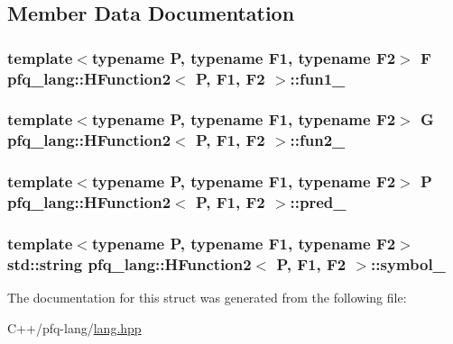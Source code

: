 \subsection{Member Data Documentation}
\hypertarget{structpfq__lang_1_1HFunction2_a1e7d18cef3f4fce903509c3562369418}{
\subsubsection[{fun1\+\_\+}]{\setlength{\rightskip}{0pt plus 5cm}template$<$typename P, typename F1, typename F2$>$ F {\bf pfq\+\_\+lang\+::\+H\+Function2}$<$ P, F1, F2 $>$\+::fun1\+\_\+}}\label{structpfq__lang_1_1HFunction2_a1e7d18cef3f4fce903509c3562369418}
\hypertarget{structpfq__lang_1_1HFunction2_a55766e7665c4a9f14f9fb5e35ca24405}{
\subsubsection[{fun2\+\_\+}]{\setlength{\rightskip}{0pt plus 5cm}template$<$typename P, typename F1, typename F2$>$ G {\bf pfq\+\_\+lang\+::\+H\+Function2}$<$ P, F1, F2 $>$\+::fun2\+\_\+}}\label{structpfq__lang_1_1HFunction2_a55766e7665c4a9f14f9fb5e35ca24405}
\hypertarget{structpfq__lang_1_1HFunction2_ab1f1307df8a4b1c23cd9e2905b308679}{
\subsubsection[{pred\+\_\+}]{\setlength{\rightskip}{0pt plus 5cm}template$<$typename P, typename F1, typename F2$>$ P {\bf pfq\+\_\+lang\+::\+H\+Function2}$<$ P, F1, F2 $>$\+::pred\+\_\+}}\label{structpfq__lang_1_1HFunction2_ab1f1307df8a4b1c23cd9e2905b308679}
\hypertarget{structpfq__lang_1_1HFunction2_a5c354f72202e280f4e01fa033709da68}{
\subsubsection[{symbol\+\_\+}]{\setlength{\rightskip}{0pt plus 5cm}template$<$typename P, typename F1, typename F2$>$ std\+::string {\bf pfq\+\_\+lang\+::\+H\+Function2}$<$ P, F1, F2 $>$\+::symbol\+\_\+}}\label{structpfq__lang_1_1HFunction2_a5c354f72202e280f4e01fa033709da68}


The documentation for this struct was generated from the following file\+:\begin{DoxyCompactItemize}
\item 
C++/pfq-\/lang/\hyperlink{lang_8hpp}{lang.\+hpp}\end{DoxyCompactItemize}
